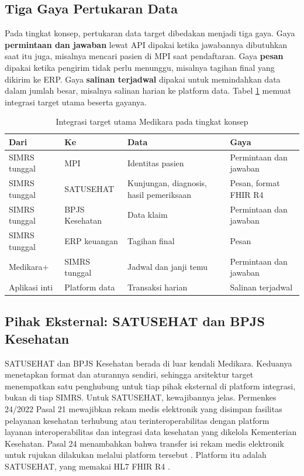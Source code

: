 \subsection*{Tiga Gaya Pertukaran Data}

Pada tingkat konsep, pertukaran data target dibedakan menjadi tiga gaya.
Gaya \textbf{permintaan dan jawaban} lewat API dipakai ketika jawabannya
dibutuhkan saat itu juga, misalnya mencari pasien di MPI saat pendaftaran.
Gaya \textbf{pesan} dipakai ketika pengirim tidak perlu menunggu, misalnya
tagihan final yang dikirim ke ERP. Gaya \textbf{salinan terjadwal} dipakai
untuk memindahkan data dalam jumlah besar, misalnya salinan harian ke
platform data. Tabel \ref{tab:ch09-integrasi-target} memuat integrasi target
utama beserta gayanya.

\begin{table}[!htb]
  \centering
  \caption{Integrasi target utama Medikara pada tingkat konsep}
  \label{tab:ch09-integrasi-target}
  \small
  \begin{tabularx}{\textwidth}{llXl}
    \hline
    \textbf{Dari} & \textbf{Ke} & \textbf{Data} & \textbf{Gaya} \\
    \hline
    SIMRS tunggal & MPI & Identitas pasien & Permintaan dan jawaban \\
    \hline
    SIMRS tunggal & SATUSEHAT & Kunjungan, diagnosis, hasil pemeriksaan & Pesan, format FHIR R4 \\
    \hline
    SIMRS tunggal & BPJS Kesehatan & Data klaim & Permintaan dan jawaban \\
    \hline
    SIMRS tunggal & ERP keuangan & Tagihan final & Pesan \\
    \hline
    Medikara+ & SIMRS tunggal & Jadwal dan janji temu & Permintaan dan jawaban \\
    \hline
    Aplikasi inti & Platform data & Transaksi harian & Salinan terjadwal \\
    \hline
  \end{tabularx}
\end{table}

\subsection*{Pihak Eksternal: SATUSEHAT dan BPJS Kesehatan}

SATUSEHAT dan BPJS Kesehatan berada di luar kendali Medikara. Keduanya
menetapkan format dan aturannya sendiri, sehingga arsitektur target
menempatkan satu penghubung untuk tiap pihak eksternal di platform
integrasi, bukan di tiap SIMRS. Untuk SATUSEHAT, kewajibannya jelas.
Permenkes 24/2022 Pasal 21 mewajibkan rekam medis elektronik yang disimpan
fasilitas pelayanan kesehatan terhubung atau terinteroperabilitas dengan
platform layanan interoperabilitas dan integrasi data kesehatan yang dikelola
Kementerian Kesehatan. Pasal 24 menambahkan bahwa transfer isi rekam medis
elektronik untuk rujukan dilakukan melalui platform tersebut
\cite{permenkes24-2022}. Platform itu adalah SATUSEHAT, yang memakai HL7
FHIR R4 \cite{c09-fhir-r4,c09-satusehat}.

